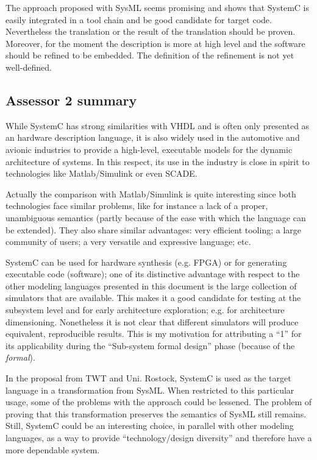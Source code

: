 The approach proposed with SysML seems promising and shows that
SystemC is easily integrated in a tool chain and be good candidate for
target code. Nevertheless the translation or the result of the
translation should be proven. Moreover, for the moment the description
is more at high level and the software should be refined to be
embedded. The definition of the refinement is not yet well-defined.

\subsection{Assessor 2 summary}
\label{sec:assessor-2-summary}

While SystemC has strong similarities with VHDL and is often only
presented as an hardware description language, it is also widely used
in the automotive and avionic industries to provide a high-level,
executable models for the dynamic architecture of systems. In this
respect, its use in the industry is close in spirit to technologies
like Matlab/Simulink or even SCADE.

Actually the comparison with Matlab/Simulink is quite interesting
since both technologies face similar problems, like for instance a
lack of a proper, unambiguous semantics (partly because of the ease
with which the language can be extended). They also share similar
advantages: very efficient tooling; a large community of users; a very
versatile and expressive language; etc.

SystemC can be used for hardware synthesis (e.g. FPGA) or for
generating executable code (software); one of its distinctive
advantage with respect to the other modeling languages presented in
this document is the large collection of simulators that are
available. This makes it a good candidate for testing at the subsystem
level and for early architecture exploration; e.g. for architecture
dimensioning. Nonetheless it is not clear that different simulators
will produce equivalent, reproducible results. This is my motivation
for attributing a ``1'' for its applicability during the ``Sub-system
formal design'' phase (because of the \emph{formal}).

In the proposal from TWT and Uni. Rostock, SystemC is used as the
target language in a transformation from SysML. When restricted to
this particular usage, some of the problems with the approach could be
lessened. The problem of proving that this transformation preserves
the semantics of SysML still remains. Still, SystemC could be an
interesting choice, in parallel with other modeling languages, as a
way to provide ``technology/design diversity'' and therefore have a
more dependable system.

